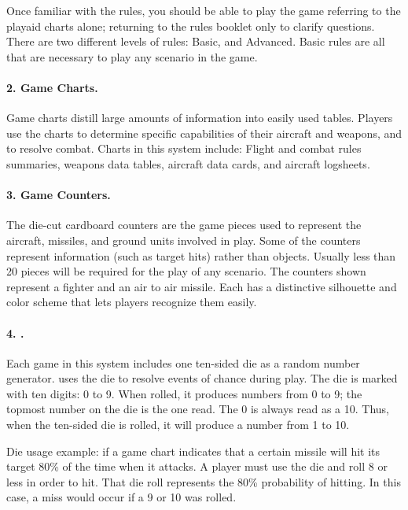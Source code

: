 Once familiar with the rules, you should be able to play the game referring to the play{\xhyphen}aid charts alone; returning to the rules booklet only to clarify questions. There are two different levels of rules: Basic, and Advanced. Basic rules are all that are necessary to play any scenario in the game.

\paragraph{2. Game Charts.} Game charts distill large amounts of information into easily used tables. Players use the charts to determine specific capabilities of their aircraft and weapons, and to resolve combat. Charts in this system include: Flight and combat rules summaries, weapons data tables, aircraft data cards, and aircraft logsheets.

\paragraph{3. Game Counters.} The die-cut cardboard counters are the game pieces used to represent the aircraft, missiles, and ground units involved in play. Some of the counters represent information (such as target hits) rather than objects. Usually less than 20 pieces will be required for the play of any scenario. The counters shown  represent a fighter and an air to air missile. Each has a distinctive silhouette and color scheme that lets players recognize them easily.



\paragraph{4. \protect{}.} Each game in this system includes one ten-sided die as a random number generator. {\AirPow} uses the die to resolve events of chance during play. The die is marked with ten digits: 0 to 9. When rolled, it produces numbers from 0 to 9; the topmost number on the die is the one read. The 0 is always read as a 10. Thus, when the ten-sided die is rolled, it will produce a number from 1 to 10.

Die usage example: if a game chart indicates that a certain missile will hit its target 80\% of the time when it attacks. A player must use the die and roll 8 or less in order to hit. That die roll represents the 80\% probability of hitting. In this case, a miss would occur if a 9 or 10 was rolled.

